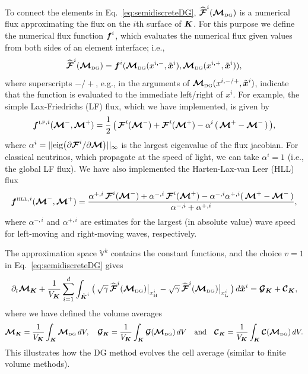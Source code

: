 \documentclass[10pt,preprint]{aastex}
\newcommand{\sumx}{\sum_{i=1}^{d}}
\begin{document}
To connect the elements in Eq.~\eqref{eq:semidiscreteDG}, $\widehat{\boldsymbol{\mathcal{F}}}^{i}(\boldsymbol{\mathcal{M}}_{\mbox{\tiny DG}})$ is a numerical flux approximating the flux on the $i$th surface of $\boldsymbol{K}$.  
For this purpose we define the numerical flux function $\boldsymbol{f}^{i}$, which evaluates the numerical flux given values from both sides of an element interface; i.e.,
\begin{equation}
  \widehat{\boldsymbol{\mathcal{F}}}^{i}(\boldsymbol{\mathcal{M}}_{\mbox{\tiny DG}})=\boldsymbol{f}^{i}(\boldsymbol{\mathcal{M}}_{\mbox{\tiny DG}}(x^{i,-},\tilde{\boldsymbol{x}}^{i}),\boldsymbol{\mathcal{M}}_{\mbox{\tiny DG}}(x^{i,+},\tilde{\boldsymbol{x}}^{i})),
\end{equation}
where superscripts $-/+$, e.g., in the arguments of $\boldsymbol{\mathcal{M}}_{\mbox{\tiny DG}}(x^{i,-/+},\tilde{\boldsymbol{x}}^{i})$, indicate that the function is evaluated to the immediate left/right of $x^{i}$.  
For example, the simple Lax-Friedrichs (LF) flux, which we have implemented, is given by
\begin{equation}
  \boldsymbol{f}^{\mbox{\tiny LF},i}(\boldsymbol{\mathcal{M}}^{-},\boldsymbol{\mathcal{M}}^{+})
  =\frac{1}{2}\,\big(\,\boldsymbol{\mathcal{F}}^{i}(\boldsymbol{\mathcal{M}}^{-})+\boldsymbol{\mathcal{F}}^{i}(\boldsymbol{\mathcal{M}}^{+})-\alpha^{i}\,(\,\boldsymbol{\mathcal{M}}^{+}-\boldsymbol{\mathcal{M}}^{-}\,)\,\big),
\end{equation}
where $\alpha^{i}=||\mbox{eig}\big(\partial\boldsymbol{\mathcal{F}}^{i}/\partial\boldsymbol{\mathcal{M}}\big)||_{\infty}$ is the largest eigenvalue of the flux jacobian.  
For classical neutrinos, which propagate at the speed of light, we can take $\alpha^{i}=1$ (i.e., the global LF flux).  
We have also implemented the Harten-Lax-van Leer (HLL) flux \citep{harten_etal_1983}
\begin{equation}
  \boldsymbol{f}^{\mbox{\tiny HLL},i}(\boldsymbol{\mathcal{M}}^{-},\boldsymbol{\mathcal{M}}^{+})
  =\frac{\alpha^{+,i}\,\boldsymbol{\mathcal{F}}^{i}(\boldsymbol{\mathcal{M}}^{-})+\alpha^{-,i}\,\boldsymbol{\mathcal{F}}^{i}(\boldsymbol{\mathcal{M}}^{+})-\alpha^{-,i}\alpha^{+,i}(\,\boldsymbol{\mathcal{M}}^{+}-\boldsymbol{\mathcal{M}}^{-}\,)}{\alpha^{-,i}+\alpha^{+,i}},
\end{equation}
where $\alpha^{-,i}$ and $\alpha^{+,i}$ are estimates for the largest (in absolute value) wave speed for left-moving and right-moving waves, respectively.  

The approximation space $\mathbb{V}^{k}$ contains the constant functions, and the choice $v=1$ in Eq.~\eqref{eq:semidiscreteDG} gives
\begin{equation}
  \partial_{t}\bcM_{\bK}
  +\f{1}{V_{\bK}}\sumx\int_{\tilde{\bK}^{i}}
  \big(\,\sqrt{\gamma}\,\widehat{\bcF}^{i}(\bcM_{\DG})\big|_{\xH^{i}}-\sqrt{\gamma}\,\widehat{\bcF}^{i}(\bcM_{\DG})\big|_{\xL^{i}}\,\big)\,d\tilde{\bx}^{i}
  =\bcG_{\bK}+\bcC_{\bK},
\end{equation}
where we have defined the volume averages
\begin{equation}
  \boldsymbol{\mathcal{M}}_{\boldsymbol{K}}=\frac{1}{V_{\boldsymbol{K}}}\int_{\boldsymbol{K}}\boldsymbol{\mathcal{M}}_{\mbox{\tiny DG}}\,dV, \quad
  \boldsymbol{\mathcal{G}}_{\boldsymbol{K}}=\frac{1}{V_{\boldsymbol{K}}}\int_{\boldsymbol{K}}\boldsymbol{\mathcal{G}}(\boldsymbol{\mathcal{M}}_{\mbox{\tiny DG}})\,dV  \quad\text{and}\quad
  \boldsymbol{\mathcal{C}}_{\boldsymbol{K}}=\frac{1}{V_{\boldsymbol{K}}}\int_{\boldsymbol{K}}\boldsymbol{\mathcal{C}}(\boldsymbol{\mathcal{M}}_{\mbox{\tiny DG}})\,dV.
\end{equation}
This illustrates how the DG method evolves the cell average (similar to finite volume methods).  
\end{document}
